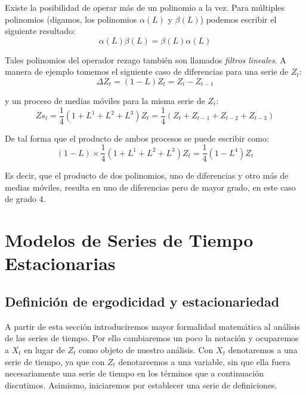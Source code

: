 \documentclass[
]{book}
\begin{document}
Existe la posibilidad de operar más de un polinomio a la vez. Para múltiples polinomios (digamos, los polinomios \(\alpha(L)\) y \(\beta(L)\)) podemos escribir el siguiente resultado:
\begin{equation}
    \alpha(L) \beta(L) = \beta(L) \alpha(L)
    \label{eq:Diff7}
\end{equation}

Tales polinomios del operador rezago también son llamados \emph{filtros lineales}. A manera de ejemplo tomemos el siguiente caso de diferencias para una serie de \(Z_t\):
\begin{equation}
    \Delta Z_{t} = (1 - L) Z_{t} = Z_{t} - Z_{t-1} 
    \label{eq:Diff8}
\end{equation}

y un proceso de medias móviles para la misma serie de \(Z_t\):
\begin{equation}
    Zs_{t} = \frac{1}{4}(1 + L^1 + L^2 + L^3) Z_{t} = \frac{1}{4}(Z_{t} + Z_{t-1} + Z_{t-2} + Z_{t-3}) 
    \label{eq:Diff9}
\end{equation}

De tal forma que el producto de ambos procesos se puede escribir como:
\begin{equation}
(1 - L) \times \frac{1}{4}(1 + L^1 + L^2 + L^3) Z_{t} = \frac{1}{4}(1 - L^4) Z_{t}
\label{eq:Diff10}
\end{equation}

Es decir, que el producto de dos polinomios, uno de diferencias y otro más de medias móviles, resulta en uno de diferencias pero de mayor grado, en este caso de grado 4.

\hypertarget{modelos-de-series-de-tiempo-estacionarias}{%
\chapter{Modelos de Series de Tiempo Estacionarias}\label{modelos-de-series-de-tiempo-estacionarias}}

\hypertarget{definiciuxf3n-de-ergodicidad-y-estacionariedad}{%
\section{Definición de ergodicidad y estacionariedad}\label{definiciuxf3n-de-ergodicidad-y-estacionariedad}}

A partir de esta sección introduciremos mayor formalidad matemática al análisis de las series de tiempo. Por ello cambiaremos un poco la notación y ocuparemos a \(X_t\) en lugar de \(Z_t\) como objeto de nuestro análisis. Con \(X_t\) denotaremos a una serie de tiempo, ya que con \(Z_t\) denotareemos a una variable, sin que ella fuera necesariamente una serie de tiempo en los términos que a continuación discutimos. Asimismo, iniciaremos por establecer una serie de definiciones.
\end{document}

